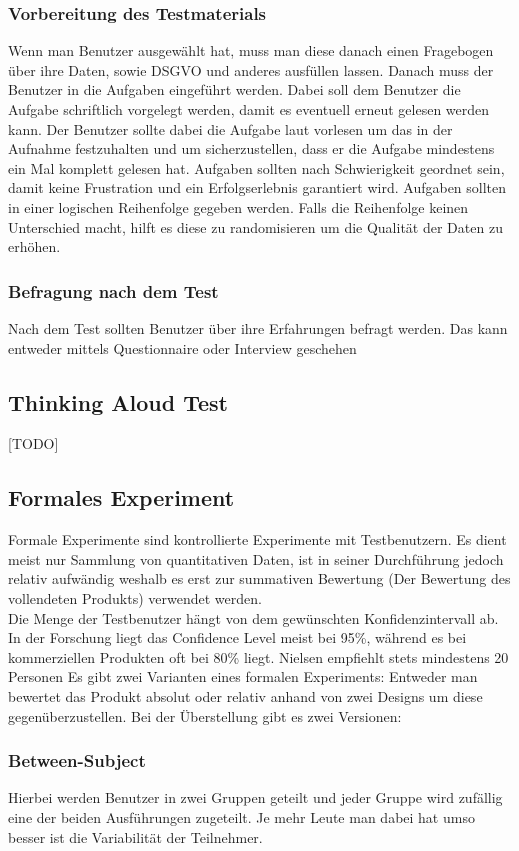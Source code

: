 \documentclass{article}
\begin{document}
	\subsubsection{Vorbereitung des Testmaterials}
	Wenn man Benutzer ausgewählt hat, muss man diese danach einen Fragebogen über ihre Daten, sowie DSGVO und anderes ausfüllen lassen. Danach muss der Benutzer in die Aufgaben eingeführt werden. Dabei soll dem Benutzer die Aufgabe schriftlich vorgelegt werden, damit es eventuell erneut gelesen werden kann. Der Benutzer sollte dabei die Aufgabe laut vorlesen um das in der Aufnahme festzuhalten und um sicherzustellen, dass er die Aufgabe mindestens ein Mal komplett gelesen hat. Aufgaben sollten nach Schwierigkeit geordnet sein, damit keine Frustration und ein Erfolgserlebnis garantiert wird. Aufgaben sollten in einer logischen Reihenfolge gegeben werden. Falls die Reihenfolge keinen Unterschied macht, hilft es diese zu randomisieren um die Qualität der Daten zu erhöhen.
	\subsubsection{Befragung nach dem Test}
	Nach dem Test sollten Benutzer über ihre Erfahrungen befragt werden. Das kann entweder mittels Questionnaire oder Interview geschehen
	\subsection{Thinking Aloud Test}
	[TODO]
	\subsection{Formales Experiment}
	Formale Experimente sind kontrollierte Experimente mit Testbenutzern. Es dient meist nur Sammlung von quantitativen Daten, ist in seiner Durchführung jedoch relativ aufwändig weshalb es erst zur summativen Bewertung (Der Bewertung des vollendeten Produkts) verwendet werden. \\
	Die Menge der Testbenutzer hängt von dem gewünschten Konfidenzintervall ab. In der Forschung liegt das Confidence Level meist bei 95\%, während es bei kommerziellen Produkten oft bei 80\% liegt. Nielsen empfiehlt stets mindestens 20 Personen
	Es gibt zwei Varianten eines formalen Experiments: Entweder man bewertet das Produkt absolut oder relativ anhand von zwei Designs um diese gegenüberzustellen. Bei der Überstellung gibt es zwei Versionen:
	\subsubsection{Between-Subject}
	Hierbei werden Benutzer in zwei Gruppen geteilt und jeder Gruppe wird zufällig eine der beiden Ausführungen zugeteilt. Je mehr Leute man dabei hat umso besser ist die Variabilität der Teilnehmer.
\end{document}
